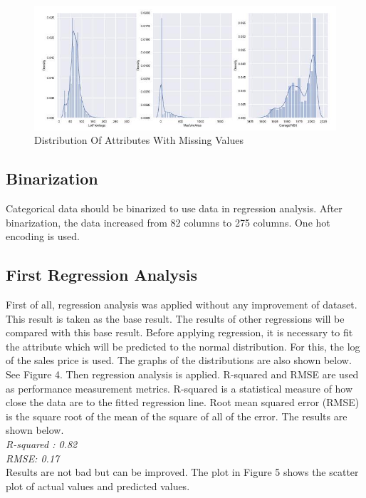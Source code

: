 \documentclass[onecolumn]{article}
\begin{document}
\begin{figure}[h]
\centering
  \includegraphics[width=0.6\linewidth]{distribution.jpg}
  \caption{Distribution Of Attributes With Missing Values}
  \label{fig:distribution}
\end{figure}


\subsection{Binarization}

Categorical data should be binarized to use data in regression analysis. After binarization, the data increased from 82 columns to 275 columns. One hot encoding is used.

\subsection{First Regression Analysis}
First of all, regression analysis was applied without any improvement of dataset. This result is taken as the base result. The results of other regressions will be compared with this base result. Before applying regression, it is necessary to fit the attribute which will be predicted to the normal distribution. For this, the log of the sales price is used. The graphs of the distributions are also shown below. See Figure 4. Then regression analysis is applied. R-squared and RMSE are used as performance measurement metrics. R-squared is a statistical measure of how close the data are to the fitted regression line. Root mean squared error (RMSE) is the square root of the mean of the square of all of the error. The results are shown below.\\
\textit{R-squared : 0.82\\
RMSE: 0.17}\\
Results are not bad but can be improved. The plot in Figure 5 shows the scatter plot of actual values and predicted values.
\end{document}
